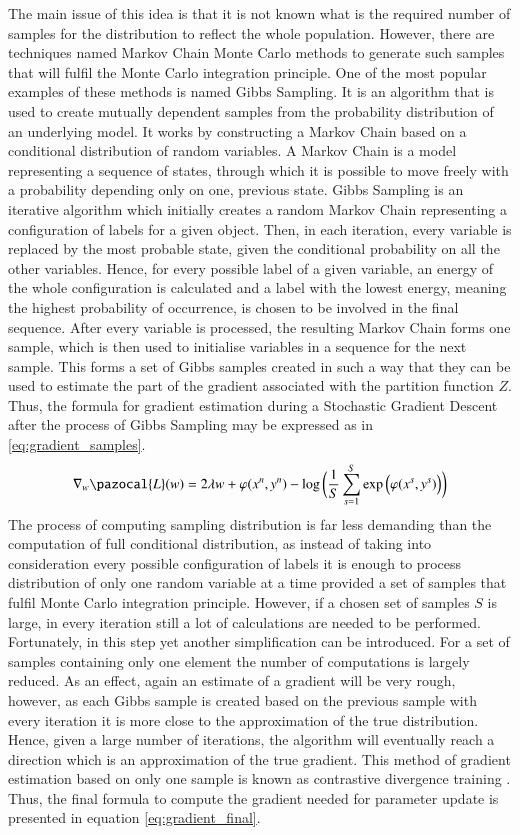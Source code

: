 The main issue of this idea is that it is not known what is the required number of samples for the distribution to reflect the whole population. However, there are techniques named Markov Chain Monte Carlo methods to generate such samples that will fulfil the Monte Carlo integration principle. One of the most popular examples of these methods is named Gibbs Sampling. It is an algorithm that is used to create mutually dependent samples from the probability distribution of an underlying model. It works by constructing a Markov Chain based on a conditional distribution of random variables. A Markov Chain is a model representing a sequence of states, through which it is possible to move freely with a probability depending only on one, previous state. Gibbs Sampling is an iterative algorithm which initially creates a random Markov Chain representing a configuration of labels for a given object. Then, in each iteration, every variable is replaced by the most probable state, given the conditional probability on all the other variables. Hence, for every possible label of a given variable, an energy of the whole configuration is calculated and a label with the lowest energy, meaning the highest probability of occurrence, is chosen to be involved in the final sequence. After every variable is processed, the resulting Markov Chain forms one sample, which is then used to initialise variables in a sequence for the next sample. This forms a set of Gibbs samples created in such a way that they can be used to estimate the part of the gradient associated with the partition function $Z$. Thus, the formula for gradient estimation during a Stochastic Gradient Descent after the process of Gibbs Sampling may be expressed as in \ref{eq:gradient_samples}.
\begin{equation}
    \label{eq:gradient_samples}
    \nabla_w\pazocal{L}(w) = 2\lambda w + 
    \varphi(x^n,y^n) -
    \log{ \bigg(
        \frac{1}{S} \sum_{s = 1}^{S}{\exp \Big( \varphi(x^s,y^{s}) \Big) } \bigg)}
\end{equation}
The process of computing sampling distribution is far less demanding than the computation of full conditional distribution, as instead of taking into consideration every possible configuration of labels it is enough to process distribution of only one random variable at a time provided a set of samples that fulfil Monte Carlo integration principle. However, if a chosen set of samples $S$ is large, in every iteration still a lot of calculations are needed to be performed. Fortunately, in this step yet another simplification can be introduced. For a set of samples containing only one element the number of computations is largely reduced. As an effect, again an estimate of a gradient will be very rough, however, as each Gibbs sample is created based on the previous sample with every iteration it is more close to the approximation of the true distribution. Hence, given a large number of iterations, the algorithm will eventually reach a direction which is an approximation of the true gradient. This method of gradient estimation based on only one sample is known as contrastive divergence training \cite{Nowozin}. Thus, the final formula to compute the gradient needed for parameter update is presented in equation \ref{eq:gradient_final}. 
